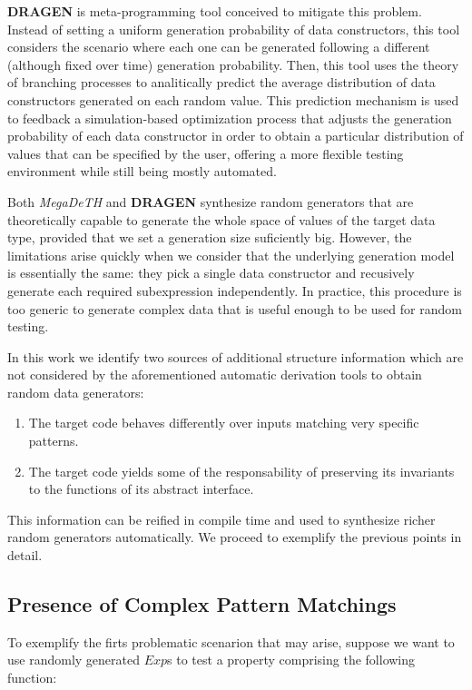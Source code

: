 \documentclass[conference]{IEEEtran}
\newcommand{\Conid}[1]{\mathit{#1}}
\newcommand{\megadeth}{\emph{MegaDeTH}\xspace}
\newcommand{\dragen}{\textbf{DRAGEN}\xspace}
\begin{document}
\dragen is meta-programming tool conceived to mitigate this problem.
%
Instead of setting a uniform generation probability of data constructors, this
tool considers the scenario where each one can be generated following a
different (although fixed over time) generation probability.
%
Then, this tool uses the theory of branching processes to analitically predict
the average distribution of data constructors generated on each random value.
%
This prediction mechanism is used to feedback a simulation-based optimization
process that adjusts the generation probability of each data constructor in
order to obtain a particular distribution of values that can be specified by the
user, offering a more flexible testing environment while still being mostly
automated.


Both \megadeth and \dragen synthesize random generators that are theoretically
capable to generate the whole space of values of the target data type, provided
that we set a generation size suficiently big.
%
However, the limitations arise quickly when we consider that the underlying
generation model is essentially the same: they pick a single data constructor
and recusively generate each required subexpression independently.
%
In practice, this procedure is too generic to generate complex data that is
useful enough to be used for random testing.


In this work we identify two sources of additional structure information which
are not considered by the aforementioned automatic derivation tools to obtain
random data generators:

\begin{enumerate}
\item The target code behaves differently over inputs matching very specific
  patterns.
\item The target code yields some of the responsability of preserving its
  invariants to the functions of its abstract interface.
\end{enumerate}

This information can be reified in compile time and used to synthesize richer
random generators automatically. We proceed to exemplify the previous points in
detail.

\subsection{\textbf{Presence of Complex Pattern Matchings}}

To exemplify the firts problematic scenarion that may arise, suppose we want to
use randomly generated \ensuremath{\Conid{Exp}}s to test a property comprising the following
function:
\end{document}
